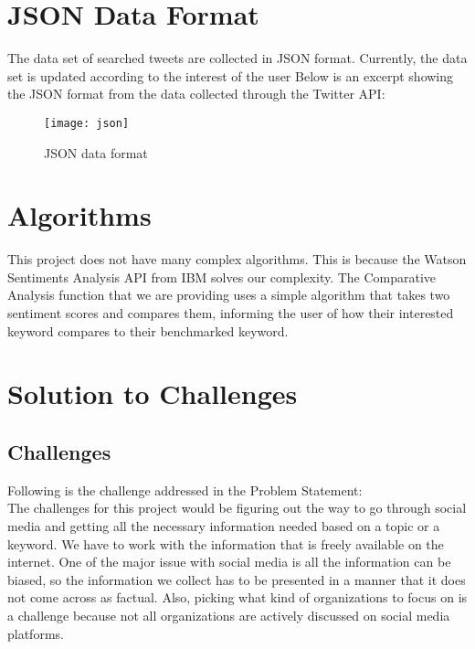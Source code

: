 \documentclass[12pt, titlepage]{article}
\begin{document}
\newpage
\section{JSON Data Format}
The data set of searched tweets are collected in JSON format. Currently, the data set is updated according to the interest of the user
Below is an excerpt showing the JSON format from the data collected through the Twitter API:
\begin{figure}[H]
\centering
\texttt{[image: json]}
\caption{JSON data format}
\label{fig:Result}
\end{figure}

\newpage
\section{Algorithms}
This project does not have many complex algorithms. This is because the Watson Sentiments Analysis API from IBM solves our complexity. The Comparative Analysis function that we are providing uses a simple algorithm that takes two sentiment scores and compares them, informing the user of how their interested keyword compares to their benchmarked keyword.


\section{Solution to Challenges}
\subsection{Challenges}
Following is the challenge addressed in the Problem Statement:\\
The challenges for this project would be figuring out the way to go through social media and getting all the necessary information needed based on a topic or a keyword. We have to work with the information that is freely available on the internet. One of the major issue with social media is all the information can be biased, so the information we collect has to be presented in a manner that it does not come across as factual. Also, picking what kind of organizations to focus on is a challenge because not all organizations are actively discussed on social media platforms.\\
\end{document}
